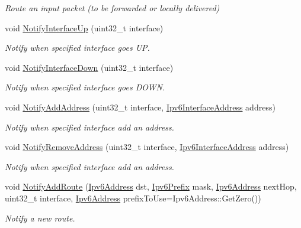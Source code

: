 \begin{DoxyCompactItemize}
\begin{DoxyCompactList}\small\item\em Route an input packet (to be forwarded or locally delivered) \end{DoxyCompactList}\item 
void \hyperlink{classIpv6ARouting_a70098c9eaf1435fef5f441a71e2dd452}{Notify\+Interface\+Up} (uint32\+\_\+t interface)
\begin{DoxyCompactList}\small\item\em Notify when specified interface goes UP. \end{DoxyCompactList}\item 
void \hyperlink{classIpv6ARouting_a5dce30466f71204c0a4dfb6a99db6c2e}{Notify\+Interface\+Down} (uint32\+\_\+t interface)
\begin{DoxyCompactList}\small\item\em Notify when specified interface goes D\+O\+WN. \end{DoxyCompactList}\item 
void \hyperlink{classIpv6ARouting_ac2913018e4f1d0cda7b48ca1e97bf9ef}{Notify\+Add\+Address} (uint32\+\_\+t interface, \hyperlink{classns3_1_1Ipv6InterfaceAddress}{Ipv6\+Interface\+Address} address)
\begin{DoxyCompactList}\small\item\em Notify when specified interface add an address. \end{DoxyCompactList}\item 
void \hyperlink{classIpv6ARouting_a9c751287bfcbee46e56a9f8696a548e1}{Notify\+Remove\+Address} (uint32\+\_\+t interface, \hyperlink{classns3_1_1Ipv6InterfaceAddress}{Ipv6\+Interface\+Address} address)
\begin{DoxyCompactList}\small\item\em Notify when specified interface add an address. \end{DoxyCompactList}\item 
void \hyperlink{classIpv6ARouting_adbd025ee04eb653e85f5a7d73a5d58c5}{Notify\+Add\+Route} (\hyperlink{classns3_1_1Ipv6Address}{Ipv6\+Address} dst, \hyperlink{classns3_1_1Ipv6Prefix}{Ipv6\+Prefix} mask, \hyperlink{classns3_1_1Ipv6Address}{Ipv6\+Address} next\+Hop, uint32\+\_\+t interface, \hyperlink{classns3_1_1Ipv6Address}{Ipv6\+Address} prefix\+To\+Use=Ipv6\+Address\+::\+Get\+Zero())
\begin{DoxyCompactList}\small\item\em Notify a new route. \end{DoxyCompactList}\item 

\end{DoxyCompactItemize}
